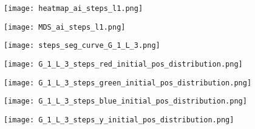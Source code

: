       

      \begin{figure}
        \centering
        \texttt{[image: heatmap\_ai\_steps\_l1.png]}
        \caption{}
        \label{fig:heatmap_ai_steps_l1}
      \end{figure}

      
      \begin{figure}[h!]
        \centering
        \texttt{[image: MDS\_ai\_steps\_l1.png]}
        \caption{}
        \label{fig:MDS_ai_steps_l1}
      \end{figure}
      


      

       \begin{figure}
         \centering
         \texttt{[image: steps\_seg\_curve\_G\_1\_L\_3.png]}
         \caption{}
         \label{fig:steps_seg_curve_G_1_L_3}
      \end{figure}



       \begin{figure}
         \centering
         \texttt{[image: G\_1\_L\_3\_steps\_red\_initial\_pos\_distribution.png]}
         \caption{}
         \label{fig:G_1_L_3_steps_red_initial_pos_distribution}
       \end{figure}



       \begin{figure}
         \centering
         \texttt{[image: G\_1\_L\_3\_steps\_green\_initial\_pos\_distribution.png]}
         \caption{}
         \label{fig:G_1_L_3_steps_green_initial_pos_distribution}
       \end{figure}


       \begin{figure}
         \centering
         \texttt{[image: G\_1\_L\_3\_steps\_blue\_initial\_pos\_distribution.png]}
         \caption{}
         \label{fig:G_1_L_3_steps_blue_initial_pos_distribution}
       \end{figure}
       

       \begin{figure}
         \centering
         \texttt{[image: G\_1\_L\_3\_steps\_y\_initial\_pos\_distribution.png]}
         \caption{}
         \label{fig:G_1_L_3_steps_y_initial_pos_distribution}
       \end{figure}


